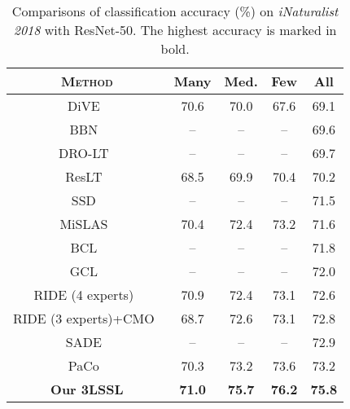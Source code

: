 \documentclass[10pt,journal,compsoc]{IEEEtran}
\begin{document}
\begin{table}[t]
\centering
\small
\renewcommand\arraystretch{1.1}
\caption{\small Comparisons of classification accuracy (\%) on \emph{iNaturalist 2018} with ResNet-50. The highest accuracy is marked in bold.}
\begin{tabular}{c|cccc}
\toprule
\textsc{Method}                            & \textsf{Many} & \textsf{Med.} & \textsf{Few} & \textsf{All} \\
\hline
DiVE~\cite{He_2021_ICCV}                   & 70.6          & 70.0          & 67.6         & 69.1  \bigstrut[t] \\
BBN~\cite{bbn}                             & --            & --            & --           & 69.6         \\
DRO-LT~\cite{Samuel_2021_ICCV}             & --            & --            & --           & 69.7         \\
ResLT~\cite{ResLTPAMI}                     & 68.5          & 69.9          & 70.4         & 70.2         \\
SSD~\cite{li2021self}                      & --            & --            & --           & 71.5         \\
MiSLAS~\cite{calibrationcvpr2021}          & 70.4          & 72.4          & 73.2         & 71.6         \\
BCL~\cite{BCLcvpr22}                       & --            & --            & --           & 71.8         \\
GCL~\cite{GCLcvpr22}                       & --            & --            & --           & 72.0         \\
RIDE (4 experts)~\cite{wang2021longtailed} & 70.9          & 72.4          & 73.1         & 72.6         \\
RIDE (3 experts)+CMO~\cite{CMOcvpr22}      & 68.7          & 72.6          & 73.1         & 72.8         \\
SADE~\cite{SADEnips22}                     & --            & --            & --           & 72.9         \\
PaCo~\cite{Cui_2021_ICCV}                  & 70.3          & 73.2          & 73.6         & 73.2         \\
\hline
\textbf{Our 3LSSL}                         &      \textbf{71.0}         &      \textbf{75.7}         &   \textbf{76.2}          &   \textbf{75.8}     \\
\bottomrule           
\end{tabular}
\label{table:resultsiNat}
\end{table}
\end{document}
